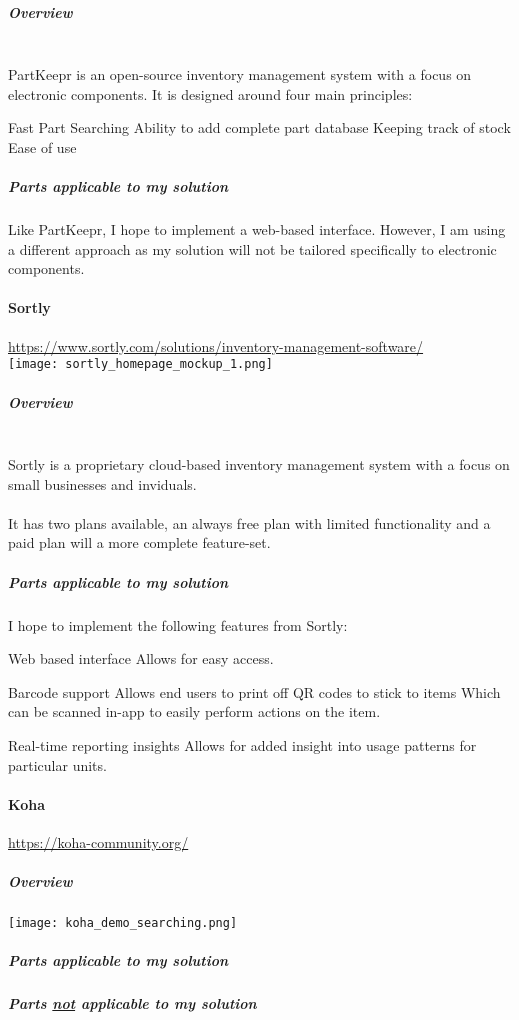 \documentclass[../../../main.tex]{subfiles}
\begin{document}
\subparagraph[indent=false]{Overview}

\noindent \\PartKeepr is an open-source inventory management system with a focus on electronic components.
It is designed around four main principles:

\begin{outline}
    \1 Fast Part Searching
    \1 Ability to add complete part database
    \1 Keeping track of stock
    \1 Ease of use
\end{outline}

\subparagraph{Parts applicable to my solution\\}

\noindent Like PartKeepr, I hope to implement a web-based interface.
However, I am using a different approach as my solution will not be tailored specifically to electronic components.

\pagebreak

\paragraph{Sortly}
\url{https://www.sortly.com/solutions/inventory-management-software/}\\

\texttt{[image: sortly\_homepage\_mockup\_1.png]}

\subparagraph{Overview}

\noindent \\Sortly is a proprietary cloud-based inventory management system with a focus on small businesses and inviduals.\\\\
It has two plans available, an always free plan with limited functionality and a paid plan will a more complete feature-set.

\subparagraph{Parts applicable to my solution\\}

I hope to implement the following features from Sortly:

\begin{outline}
    \1 Web based interface
    \2 Allows for easy access.

    \1 Barcode support
    \2 Allows end users to print off QR codes to stick to items
    \2 Which can be scanned in-app to easily perform actions on the item.

    \1 Real-time reporting insights
    \2 Allows for added insight into usage patterns for particular units.
\end{outline}

\pagebreak

\paragraph{Koha\\}
\url{https://koha-community.org/}

\subparagraph{Overview}

\texttt{[image: koha\_demo\_searching.png]}

\subparagraph{Parts applicable to my solution\\}
\subparagraph{Parts \underline{not} applicable to my solution\\}
\end{document}
